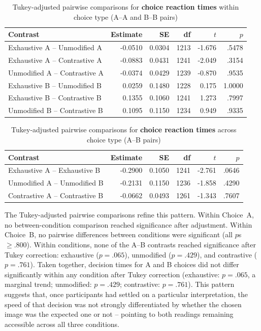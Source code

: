 \documentclass[a4paper, ruler]{CUP-JNL-LIN}%
\begin{document}
\begin{table}[htbp]
\centering
\caption{Tukey-adjusted pairwise comparisons for \textbf{choice reaction times} within choice type (A--A and B--B pairs)}
\label{tab:choice-rt-pairwise-within-choice}
\begin{tabularx}{\textwidth}{@{}Xrrrrr@{}}
\toprule
Contrast & Estimate & SE & df & $t$ & $p$ \\
\midrule
Exhaustive A -- Unmodified A   & -0.0510 & 0.0304 & 1213 & -1.676 & .5478 \\
Exhaustive A -- Contrastive A  & -0.0883 & 0.0431 & 1241 & -2.049 & .3154 \\
Unmodified A -- Contrastive A  & -0.0374 & 0.0429 & 1239 & -0.870 & .9535 \\
Exhaustive B -- Unmodified B   &  0.0259 & 0.1480 & 1228 &  0.175 & 1.0000 \\
Exhaustive B -- Contrastive B  &  0.1355 & 0.1060 & 1241 &  1.273 & .7997 \\
Unmodified B -- Contrastive B  &  0.1095 & 0.1150 & 1234 &  0.949 & .9335 \\
\bottomrule
\end{tabularx}
\end{table}

\begin{table}[htbp]
\centering
\caption{Tukey-adjusted pairwise comparisons for \textbf{choice reaction times} across choice type (A--B pairs)}
\label{tab:choice-rt-pairwise-across-choice}
\begin{tabularx}{\textwidth}{@{}Xrrrrr@{}}
\toprule
Contrast & Estimate & SE & df & $t$ & $p$ \\
\midrule
Exhaustive A -- Exhaustive B   & -0.2900 & 0.1050 & 1241 & -2.761 & .0646 \\
Unmodified A -- Unmodified B   & -0.2131 & 0.1150 & 1236 & -1.858 & .4290 \\
Contrastive A -- Contrastive B & -0.0662 & 0.0493 & 1261 & -1.343 & .7607 \\
\bottomrule
\end{tabularx}
\end{table}

The Tukey-adjusted pairwise comparisons refine this pattern. Within Choice~A, no between-condition comparison reached significance after adjustment. Within Choice~B, no pairwise differences between conditions were significant (all $p$s $\ge .800$). 
Within conditions, none of the A--B contrasts reached significance after Tukey correction: exhaustive ($p=.065$), unmodified ($p=.429$), and contrastive ($p=.761$). Taken together, decision times for A and B choices did not differ significantly within any condition after Tukey correction (exhaustive: $p=.065$, a marginal trend; unmodified: $p=.429$; contrastive: $p=.761$). This pattern suggests that, once participants had settled on a particular interpretation, the speed of that decision was not strongly differentiated by whether the chosen image was the expected one or not -- pointing to both readings remaining accessible across all three conditions.
\end{document}
